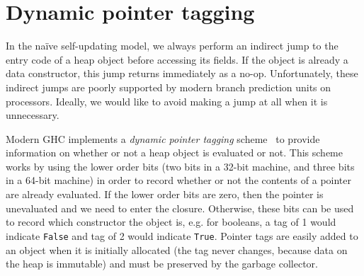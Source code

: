



\section{Dynamic pointer tagging} \label{sec:tagging}

In the na\"ive self-updating model, we always perform an indirect jump
to the entry code of a heap object before accessing its fields.  If the
object is already a data constructor, this jump returns immediately as a
no-op.  Unfortunately, these indirect jumps are poorly supported by
modern branch prediction units on processors.  Ideally, we would like
to avoid making a jump at all when it is unnecessary.

Modern GHC implements a \emph{dynamic pointer tagging}
scheme~\cite{Marlow2007} to provide information on whether or not a heap
object is evaluated or not.  This scheme works by using the lower order
bits (two bits in a 32-bit machine, and three bits in a 64-bit machine)
in order to record whether or not the contents of a pointer are already
evaluated.  If the lower order bits are zero, then the pointer is
unevaluated and we need to enter the closure.  Otherwise, these bits can
be used to record which constructor the object is, e.g. for booleans, a
tag of 1 would indicate \verb|False| and tag of 2 would indicate
\verb|True|.  Pointer tags are easily added to an object when it is
initially allocated (the tag never changes, because data on the heap is
immutable) and must be preserved by the garbage collector.


